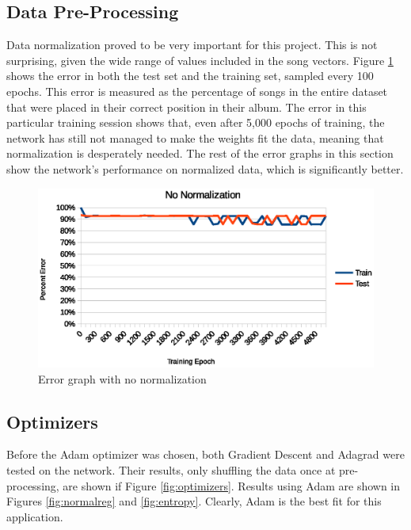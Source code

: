 \documentclass{article}
\begin{document}
\subsection{Data Pre-Processing}
Data normalization proved to be very important for this project. This is not surprising, given the wide range of values included in the song vectors. Figure \ref{fig:nonorm} shows the error in both the test set and the training set, sampled every 100 epochs. This error is measured as the percentage of songs in the entire dataset that were placed in their correct position in their album. The error in this particular training session shows that, even after 5,000 epochs of training, the network has still not managed to make the weights fit the data, meaning that normalization is desperately needed. The rest of the error graphs in this section show the network's performance on normalized data, which is significantly better.

\begin{figure}
\includegraphics[width=\textwidth]{No-Normalization.eps}
\caption{Error graph with no normalization}
\label{fig:nonorm}
\end{figure}
\subsection{Optimizers}
Before the Adam optimizer was chosen, both Gradient Descent and Adagrad were tested on the network. Their results, only shuffling the data once at pre-processing, are shown if Figure \ref{fig:optimizers}. Results using Adam are shown in Figures \ref{fig:normalreg} and \ref{fig:entropy}. Clearly, Adam is the best fit for this application.
\end{document}
